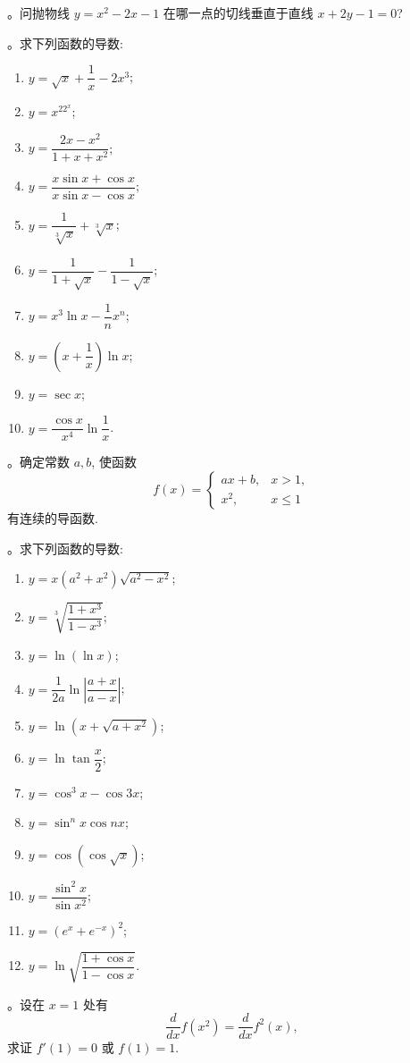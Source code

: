 。问抛物线 $y=x^2-2x-1$ 在哪一点的切线垂直于直线 $x+2y-1=0$?

。求下列函数的导数:
\begin{enumerate}
  \item $y=\sqrt{x}+\dfrac1x-2x^3$;
  \item $y=x^22^x$;
  \item $y=\dfrac{2x-x^2}{1+x+x^2}$;
  \item $y=\dfrac{x\sin x+\cos x}{x\sin x-\cos x}$;
  \item $y=\dfrac1{\sqrt[3]{x}}+\sqrt[3]{x}$;
  \item $y=\dfrac1{1+\sqrt{x}}-\dfrac1{1-\sqrt{x}}$;
  \item $y=x^3\ln x-\dfrac1n x^n$;
  \item $y=\left(x+\dfrac1x\right)\ln x$;
  \item $y=\sec x$;
  \item $y=\dfrac{\cos x}{x^4}\ln\dfrac1x$.
\end{enumerate}

。确定常数 $a,b$, 使函数
\[
  f(x)=
  \begin{cases}
    ax+b, & x>1,\\
    x^2, & x\leqslant1
  \end{cases}
\]
有连续的导函数.

。求下列函数的导数:
\begin{enumerate}
  \item $y=x(a^2+x^2)\sqrt{a^2-x^2}$;
  \item $y=\sqrt[3]{\dfrac{1+x^3}{1-x^3}}$;
  \item $y=\ln(\ln x)$;
  \item $y=\dfrac1{2a}\ln\left|\dfrac{a+x}{a-x}\right|$;
  \item $y=\ln(x+\sqrt{a+x^2})$;
  \item $y=\ln\tan\dfrac x2$;
  \item $y=\cos^3x-\cos3x$;
  \item $y=\sin^nx\cos nx$;
  \item $y=\cos(\cos\sqrt{x})$;
  \item $y=\dfrac{\sin^2x}{\sin x^2}$;
  \item $y=(e^x+e^{-x})^2$;
  \item $y=\ln\sqrt{\dfrac{1+\cos x}{1-\cos x}}$.
\end{enumerate}

。设在 $x=1$ 处有
\[
  \frac{d}{dx}f(x^2)=\frac{d}{dx}f^2(x),
\]
求证 $f'(1)=0$ 或 $f(1)=1$.

